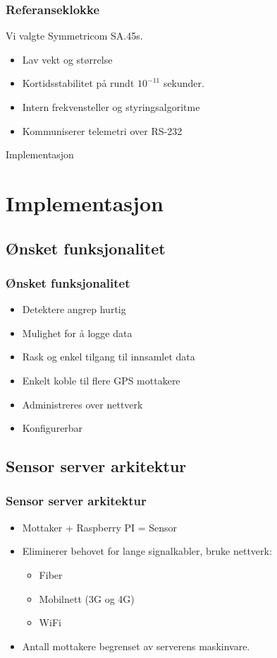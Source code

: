 \documentclass[xcolor=table]{beamer}
\begin{document}
\begin{frame}
  \frametitle{Referanseklokke}
  Vi valgte Symmetricom SA.45s. 
  \begin{itemize}
    \item Lav vekt og størrelse
    \item Kortidsstabilitet på rundt $10^{-11}$ sekunder.
    \item Intern frekvensteller og styringsalgoritme
    \item Kommuniserer telemetri over RS-232
  \end{itemize}
\end{frame}

\begin{frame}
\centering
Implementasjon
\end{frame}

\section{Implementasjon}
\subsection{Ønsket funksjonalitet}
\begin{frame}
  \frametitle{Ønsket funksjonalitet}
  \begin{itemize}
    \item Detektere angrep hurtig
    \item Mulighet for å logge data
    \item Rask og enkel tilgang til innsamlet data
    \item Enkelt koble til flere GPS mottakere
    \item Administreres over nettverk
    \item Konfigurerbar 
  \end{itemize}
\end{frame}

\subsection{Sensor server arkitektur}
\begin{frame}
  \frametitle{Sensor server arkitektur}
  \begin{itemize}
    \item Mottaker + Raspberry PI = Sensor
    \item Eliminerer behovet for lange signalkabler, bruke nettverk:
    \begin{itemize}
      \item Fiber
      \item Mobilnett (3G og 4G)
      \item WiFi
    \end{itemize}
    \item Antall mottakere begrenset av serverens maskinvare.
  \end{itemize}
\end{frame}
\end{document}
